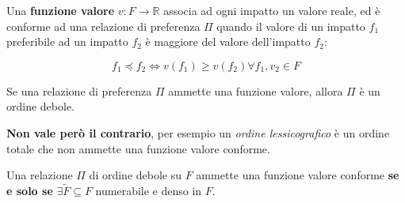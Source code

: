 \documentclass[\main/main.tex]{subfiles}
\begin{document}
\vspace{5mm}

Una \textbf{funzione valore} $v: F \rightarrow \mathbb{R}$ associa ad ogni impatto un valore reale, ed è conforme ad una relazione di preferenza $\Pi$ quando il valore di un impatto $f_1$ preferibile ad un impatto $f_2$ è maggiore del valore dell'impatto $f_2$:

\[
  f_1 \preceq f_2 \Leftrightarrow v(f_1) \geq v(f_2) \forall f_1, v_2 \in F
\]

Se una relazione di preferenza $\Pi$ ammette una funzione valore, allora $\Pi$ è un ordine debole.

\textbf{Non vale però il contrario}, per esempio un \textit{ordine lessicografico} è un ordine totale che non ammette una funzione valore conforme.

Una relazione $\Pi$ di ordine debole su $F$ ammette una funzione valore conforme \textbf{se e solo se} $\exists \tilde{F} \subseteq F$ numerabile e denso in $F$.
\end{document}
